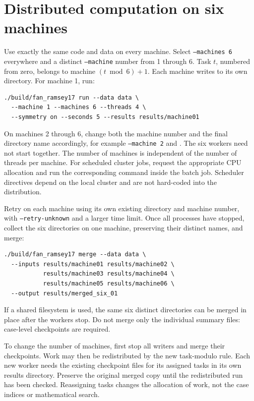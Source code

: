\documentclass[11pt]{article}
\newcommand{\file}[1]{\path{#1}}
\begin{document}
\section{Distributed computation on six machines}

Use exactly the same code and data on every machine. Select
\texttt{--machines 6} everywhere and a distinct \texttt{--machine}
number from 1 through 6. Task $t$, numbered from zero, belongs to machine
$(t\bmod 6)+1$. Each machine writes to its own directory. For machine
1, run:
\begingroup\footnotesize
\begin{verbatim}
./build/fan_ramsey17 run --data data \
  --machine 1 --machines 6 --threads 4 \
  --symmetry on --seconds 5 --results results/machine01
\end{verbatim}
\endgroup
On machines 2 through 6, change both the machine number and the final
directory name accordingly, for example \texttt{--machine 2} and
\file{results/machine02}. The six workers need not start together.
The number of machines is independent of the number of threads per
machine. For scheduled cluster jobs, request the appropriate CPU
allocation and run the corresponding command inside the batch job.
Scheduler directives depend on the local cluster and are not hard-coded
into the distribution.

Retry on each machine using its own existing directory and machine
number, with \texttt{--retry-unknown} and a larger time limit. Once all
processes have stopped, collect the six directories on one machine,
preserving their distinct names, and merge:
\begingroup\footnotesize
\begin{verbatim}
./build/fan_ramsey17 merge --data data \
  --inputs results/machine01 results/machine02 \
           results/machine03 results/machine04 \
           results/machine05 results/machine06 \
  --output results/merged_six_01
\end{verbatim}
\endgroup
If a shared filesystem is used, the same six distinct directories can
be merged in place after the workers stop. Do not merge only the
individual summary files: case-level checkpoints are required.

To change the number of machines, first stop all writers and merge their
checkpoints. Work may then be redistributed by the new task-modulo rule.
Each new worker needs the existing checkpoint files for its assigned
tasks in its own results directory. Preserve the original merged copy
until the redistributed run has been checked. Reassigning tasks changes
the allocation of work, not the case indices or mathematical search.
\end{document}
